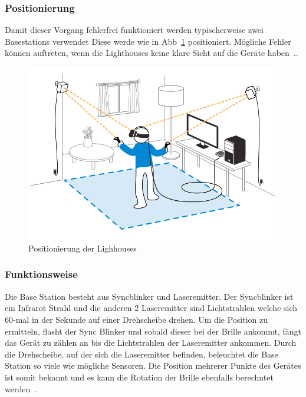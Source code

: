 \subsubsection{Positionierung}

Damit dieser Vorgang fehlerfrei funktioniert werden typischerweise zwei Basestations verwendet
Diese werde wie in Abb~\ref{fig:basetstation_positioning} positioniert.
Mögliche Fehler können auftreten, wenn die Lighthouses keine klare Sicht auf die Geräte haben~\cite{steam_lighhouse_versions}..

\begin{figure}
    \centering
    \includegraphics[scale=0.4]{pics/basestations_positioning}
    \caption{Positionierung der Lighhouses~\cite{Sercan_2018}}
    \label{fig:basetstation_positioning}
\end{figure}

\subsubsection{Funktionsweise}

Die Base Station besteht aus Syncblinker und Laseremitter.
Der Syncblinker ist ein Infrarot Strahl und die anderen 2 Laseremitter sind Lichtstrahlen welche sich 60-mal in der Sekunde auf einer Drehscheibe drehen.
Um die Position zu ermitteln, flasht der Sync Blinker und sobald dieser bei der Brille ankommt, fängt das Gerät zu zählen an bis die Lichtstrahlen der Laseremitter ankommen.
Durch die Drehscheibe, auf der sich die Laseremitter befinden, beleuchtet die Base Station so viele wie mögliche Sensoren.
Die Position mehrerer Punkte des Gerätes ist somit bekannt und es kann die Rotation der Brille ebenfalls berechntet werden~\cite{Buckley_2015, Skarredghost_2017}.

